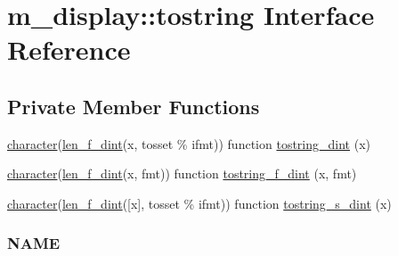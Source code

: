 \hypertarget{interfacem__display_1_1tostring}{}\section{m\+\_\+display\+:\+:tostring Interface Reference}
\label{interfacem__display_1_1tostring}
\subsection*{Private Member Functions}
\begin{DoxyCompactItemize}
\item 
\hyperlink{option__stopwatch_83_8txt_abd4b21fbbd175834027b5224bfe97e66}{character}(\hyperlink{namespacem__display_a6a2709cf5f243ee492f223b40c6b5143}{len\+\_\+f\+\_\+dint}(x, tosset \% ifmt)) function \hyperlink{interfacem__display_1_1tostring_aebf0ddff3dd9c09adf462a033836d727}{tostring\+\_\+dint} (x)
\item 
\hyperlink{option__stopwatch_83_8txt_abd4b21fbbd175834027b5224bfe97e66}{character}(\hyperlink{namespacem__display_a6a2709cf5f243ee492f223b40c6b5143}{len\+\_\+f\+\_\+dint}(x, fmt)) function \hyperlink{interfacem__display_1_1tostring_aeeab66dd4067f9327d18db4a47655977}{tostring\+\_\+f\+\_\+dint} (x, fmt)
\item 
\hyperlink{option__stopwatch_83_8txt_abd4b21fbbd175834027b5224bfe97e66}{character}(\hyperlink{namespacem__display_a6a2709cf5f243ee492f223b40c6b5143}{len\+\_\+f\+\_\+dint}(\mbox{[}x\mbox{]}, tosset \% ifmt)) function \hyperlink{interfacem__display_1_1tostring_afe88bd80ae8b45f99351f7feae986018}{tostring\+\_\+s\+\_\+dint} (x)
\begin{DoxyCompactList}\small\item\em \subsubsection*{N\+A\+ME}


\end{DoxyCompactList}
\end{DoxyCompactItemize}
